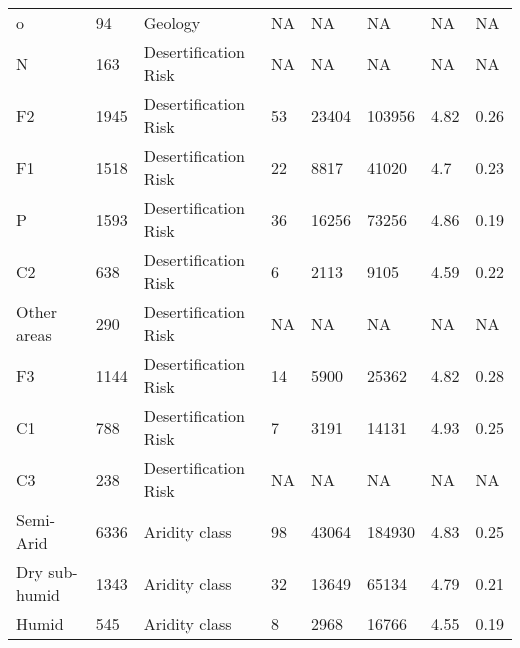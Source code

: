 \begin{sidewaystable*}
\begin{tabular*}{\textwidth}{@{\extracolsep{\fill}}llllllll@{\extracolsep{\fill}}}
o                                               & 94   & Geology              & NA      & NA             & NA            & NA            & NA          \\
N                                               & 163  & Desertification Risk & NA      & NA             & NA            & NA            & NA          \\
F2                                              & 1945 & Desertification Risk & 53      & 23404          & 103956        & 4.82          & 0.26        \\
F1                                              & 1518 & Desertification Risk & 22      & 8817           & 41020         & 4.7           & 0.23        \\
P                                               & 1593 & Desertification Risk & 36      & 16256          & 73256         & 4.86          & 0.19        \\
C2                                              & 638  & Desertification Risk & 6       & 2113           & 9105          & 4.59          & 0.22        \\
Other areas                                     & 290  & Desertification Risk & NA      & NA             & NA            & NA            & NA          \\
F3                                              & 1144 & Desertification Risk & 14      & 5900           & 25362         & 4.82          & 0.28        \\
C1                                              & 788  & Desertification Risk & 7       & 3191           & 14131         & 4.93          & 0.25        \\
C3                                              & 238  & Desertification Risk & NA      & NA             & NA            & NA            & NA          \\
Semi-Arid                                       & 6336 & Aridity class        & 98      & 43064          & 184930        & 4.83          & 0.25        \\
Dry sub-humid                                   & 1343 & Aridity class        & 32      & 13649          & 65134         & 4.79          & 0.21        \\
Humid                                           & 545  & Aridity class        & 8       & 2968           & 16766         & 4.55          & 0.19       
\end{tabular*}
\end{sidewaystable*}


